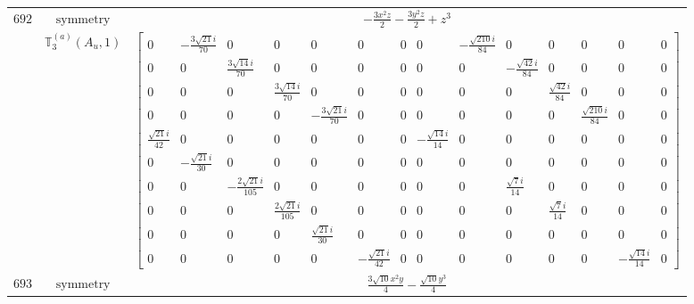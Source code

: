 \documentclass[fleqn,8pt,landscape]{jsarticle}
\begin{document}
\begin{longtable}{ccc}
$ 692 $ & $ \text{symmetry} $ & $ - \frac{3 x^{2} z}{2} - \frac{3 y^{2} z}{2} + z^{3} $ \\
$  $ & $ \mathbb{T}_{3}^{(a)}(A_{u},1) $ & $ \begin{bmatrix} 0 & - \frac{3 \sqrt{21} i}{70} & 0 & 0 & 0 & 0 & 0 & 0 & - \frac{\sqrt{210} i}{84} & 0 & 0 & 0 & 0 & 0 \\ 0 & 0 & \frac{3 \sqrt{14} i}{70} & 0 & 0 & 0 & 0 & 0 & 0 & - \frac{\sqrt{42} i}{84} & 0 & 0 & 0 & 0 \\ 0 & 0 & 0 & \frac{3 \sqrt{14} i}{70} & 0 & 0 & 0 & 0 & 0 & 0 & \frac{\sqrt{42} i}{84} & 0 & 0 & 0 \\ 0 & 0 & 0 & 0 & - \frac{3 \sqrt{21} i}{70} & 0 & 0 & 0 & 0 & 0 & 0 & \frac{\sqrt{210} i}{84} & 0 & 0 \\ \frac{\sqrt{21} i}{42} & 0 & 0 & 0 & 0 & 0 & 0 & - \frac{\sqrt{14} i}{14} & 0 & 0 & 0 & 0 & 0 & 0 \\ 0 & - \frac{\sqrt{21} i}{30} & 0 & 0 & 0 & 0 & 0 & 0 & 0 & 0 & 0 & 0 & 0 & 0 \\ 0 & 0 & - \frac{2 \sqrt{21} i}{105} & 0 & 0 & 0 & 0 & 0 & 0 & \frac{\sqrt{7} i}{14} & 0 & 0 & 0 & 0 \\ 0 & 0 & 0 & \frac{2 \sqrt{21} i}{105} & 0 & 0 & 0 & 0 & 0 & 0 & \frac{\sqrt{7} i}{14} & 0 & 0 & 0 \\ 0 & 0 & 0 & 0 & \frac{\sqrt{21} i}{30} & 0 & 0 & 0 & 0 & 0 & 0 & 0 & 0 & 0 \\ 0 & 0 & 0 & 0 & 0 & - \frac{\sqrt{21} i}{42} & 0 & 0 & 0 & 0 & 0 & 0 & - \frac{\sqrt{14} i}{14} & 0 \end{bmatrix} $ \\ \hline
$ 693 $ & $ \text{symmetry} $ & $ \frac{3 \sqrt{10} x^{2} y}{4} - \frac{\sqrt{10} y^{3}}{4} $ \\

\end{longtable}
\end{document}
